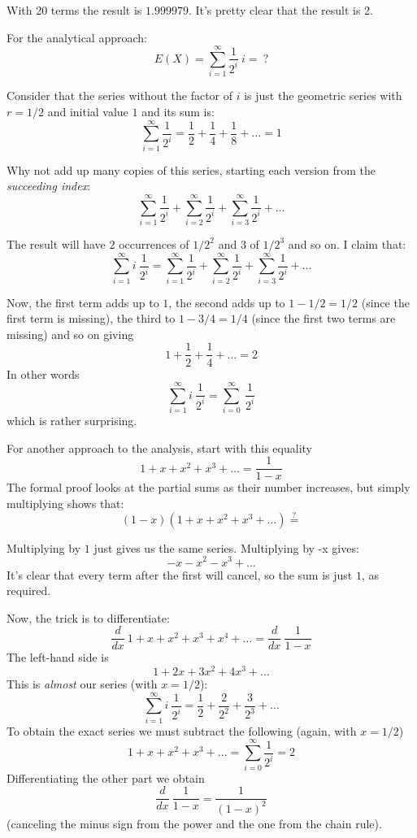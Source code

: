 \documentclass[11pt, oneside]{article}   	%
\begin{document}
With 20 terms the result is $1.999979$.  It's pretty clear that the result is 2.

For the analytical approach:
\[ E(X) = \sum_{i=1}^{\infty} \frac{1}{2^i} \ i = \ ? \]

Consider that the series without the factor of $i$ is just the geometric series with $r=1/2$ and initial value $1$ and its sum is:
\[ \sum_{i=1}^{\infty} \frac{1}{2^i} = \frac{1}{2} + \frac{1}{4} + \frac{1}{8} + \dots = 1 \]

Why not add up many copies of this series, starting each version from the \emph{succeeding index}:
\[ \sum_{i=1}^{\infty} \frac{1}{2^i} + \sum_{i=2}^{\infty} \frac{1}{2^i} + \sum_{i=3}^{\infty} \frac{1}{2^i} + \dots \]

The result will have $2$ occurrences of $1/2^2$ and $3$ of $1/2^3$ and so on.  I claim that:
\[ \sum_{i=1}^{\infty} i \ \frac{1}{2^i}  = \sum_{i=1}^{\infty} \frac{1}{2^i} + \sum_{i=2}^{\infty} \frac{1}{2^i} + \sum_{i=3}^{\infty} \frac{1}{2^i} + \dots \]

Now, the first term adds up to $1$, the second adds up to $1 - 1/2 = 1/2$ (since the first term is missing), the third to $1 - 3/4 = 1/4$ (since the first two terms are missing) and so on giving
\[ 1 + \frac{1}{2} + \frac{1}{4} + \dots = 2 \]
In other words
\[ \sum_{i=1}^{\infty} i \ \frac{1}{2^i} = \sum_{i=0}^{\infty} \ \frac{1}{2^i} \]
which is rather surprising.

For another approach to the analysis, start with this equality
\[ 1 + x + x^2 + x^3 + \dots =  \frac{1}{1-x} \]
The formal proof looks at the partial sums as their number increases, but simply multiplying shows that:
\[ (1-x) (1 + x + x^2 + x^3 + \dots) \stackrel{?}{=} \]

Multiplying by $1$ just gives us the same series.  Multiplying by -x gives:
\[ -x - x^2 - x^3  + \dots \]
It's clear that every term after the first will cancel, so the sum is just $1$, as required.  

Now, the trick is to differentiate:
\[ \frac{d}{dx} \ 1 + x + x^2 + x^3  + x^4 + \dots = \frac{d}{dx} \ \frac{1}{1-x} \]
The left-hand side is
\[ 1 + 2x + 3x^2 + 4x^3 + \dots \]
This is \emph{almost} our series (with $x = 1/2$):
\[ \sum_{i=1}^{\infty} i \ \frac{1}{2^i} = \frac{1}{2} +  \frac{2}{2^2} +  \frac{3}{2^3}  + \dots \]
To obtain the exact series we must subtract the following (again, with $x = 1/2$)
\[ 1 + x + x^2 + x^3 + \dots = \sum_{i=0}^{\infty} \frac{1}{2^i} = 2 \]
Differentiating the other part we obtain
\[ \frac{d}{dx} \ \frac{1}{1-x} = \frac{1}{(1-x)^2} \]
(canceling the minus sign from the power and the one from the chain rule).
\end{document}
